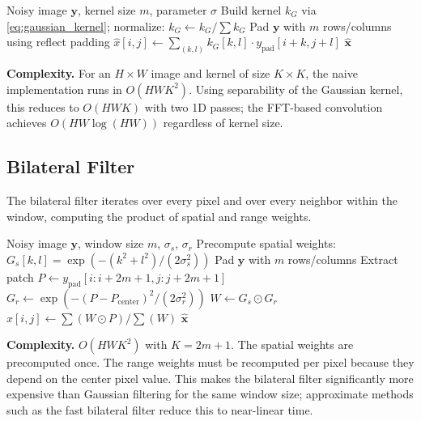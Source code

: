 \documentclass[conference]{IEEEtran}
\begin{document}
\begin{algorithm}
\caption{Gaussian Filter}
\begin{algorithmic}[1]
\Require Noisy image $\mathbf{y}$, kernel size $m$, parameter $\sigma$
\State Build kernel $k_G$ via \eqref{eq:gaussian_kernel}; normalize: $k_G \leftarrow k_G / \sum k_G$
\State Pad $\mathbf{y}$ with $m$ rows/columns using reflect padding
  \State $\hat{x}[i,j] \leftarrow \sum_{(k,l)} k_G[k,l] \cdot y_{\text{pad}}[i+k, j+l]$
\EndFor
\State \Return $\hat{\mathbf{x}}$
\end{algorithmic}
\end{algorithm}

\textbf{Complexity.} For an $H \times W$ image and kernel of size $K \times K$, the naive implementation runs in $O(HW K^2)$. Using separability of the Gaussian kernel, this reduces to $O(HWK)$ with two 1D passes; the FFT-based convolution achieves $O(HW \log(HW))$ regardless of kernel size.

\subsection{Bilateral Filter}

The bilateral filter iterates over every pixel and over every neighbor within the window, computing the product of spatial and range weights.

\begin{algorithm}
\caption{Bilateral Filter}
\begin{algorithmic}[1]
\Require Noisy image $\mathbf{y}$, window size $m$, $\sigma_s$, $\sigma_r$
\State Precompute spatial weights: $G_s[k,l] = \exp(-(k^2+l^2)/(2\sigma_s^2))$
\State Pad $\mathbf{y}$ with $m$ rows/columns
  \State Extract patch $P \leftarrow y_{\text{pad}}[i:i+2m+1, j:j+2m+1]$
  \State $G_r \leftarrow \exp(-(P - P_{\text{center}})^2 / (2\sigma_r^2))$
  \State $W \leftarrow G_s \odot G_r$ 
  \State $\hat{x}[i,j] \leftarrow \sum(W \odot P) / \sum(W)$
\EndFor
\State \Return $\hat{\mathbf{x}}$
\end{algorithmic}
\end{algorithm}

\textbf{Complexity.} $O(HW K^2)$ with $K = 2m+1$. The spatial weights are precomputed once. The range weights must be recomputed per pixel because they depend on the center pixel value. This makes the bilateral filter significantly more expensive than Gaussian filtering for the same window size; approximate methods such as the fast bilateral filter reduce this to near-linear time.
\end{document}
